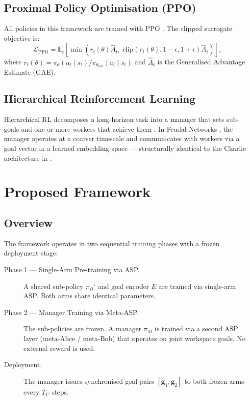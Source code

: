 \documentclass[12pt, a4paper]{article}
\newcommand{\piB}{\pi_B}
\newcommand{\piM}{\pi_M}
\newcommand{\Enc}{E}
\newcommand{\goalvec}{\mathbf{g}}
\newcommand{\calL}{\mathcal{L}}
\begin{document}
\subsection{Proximal Policy Optimisation (PPO)}
\label{subsec:ppo}

All policies in this framework are trained with PPO \cite{schulman2017proximal}. The
clipped surrogate objective is:
\begin{equation}
    \calL_{\mathrm{PPO}} = \mathbb{E}_t\!\left[
        \min\!\left(
            r_t(\theta)\hat{A}_t,\;
            \mathrm{clip}(r_t(\theta), 1-\epsilon, 1+\epsilon)\hat{A}_t
        \right)
    \right], \label{eq:ppo}
\end{equation}
where $r_t(\theta) = \pi_\theta(a_t \mid s_t) / \pi_{\theta_{\mathrm{old}}}(a_t \mid s_t)$
and $\hat{A}_t$ is the Generalised Advantage Estimate (GAE).

\subsection{Hierarchical Reinforcement Learning}
\label{subsec:hrl}

Hierarchical RL decomposes a long-horizon task into a manager that sets sub-goals and
one or more workers that achieve them \cite{vezhnevets2017feudal,nachum2018data}.
In Feudal Networks \cite{vezhnevets2017feudal}, the manager operates at a coarser timescale
and communicates with workers via a goal vector in a learned embedding space —
structurally identical to the Charlie architecture in \citet{sukhbaatar2018learning}.

\section{Proposed Framework}
\label{sec:framework}

\subsection{Overview}
\label{subsec:overview}

The framework operates in two sequential training phases with a frozen deployment stage:

\begin{description}
    \item[Phase 1 — Single-Arm Pre-training via ASP.]
          A shared sub-policy $\piB'$ and goal encoder $\Enc$ are trained via single-arm
          ASP. Both arms share identical parameters.

    \item[Phase 2 — Manager Training via Meta-ASP.]
          The sub-policies are frozen. A manager $\piM$ is trained via a second ASP layer
          (meta-Alice / meta-Bob) that operates on joint workspace goals. No external reward
          is used.

    \item[Deployment.]
          The manager issues synchronised goal pairs $[\goalvec_1, \goalvec_2]$ to both
          frozen arms every $T_C$ steps.
\end{description}
\end{document}
